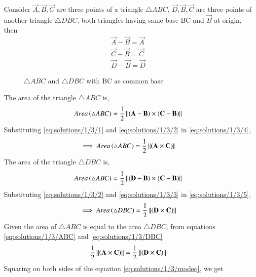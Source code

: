  Consider $\vec{A},\vec{B},\vec{C}$ are three points of a triangle $\triangle ABC$, $\vec{D}, \vec{B}, \vec{C}$ are three points of another triangle $\triangle DBC$, both triangles having same base BC and $\vec{B}$ at origin, then
\begin{align}
    \label{eq:solutions/1/3/1}
    \vec{A}-\vec{B}=\vec{A}\\
    \label{eq:solutions/1/3/2}
    \vec{C}-\vec{B}=\vec{C}\\
    \label{eq:solutions/1/3/3}
    \vec{D}-\vec{B}=\vec{D}
\end{align}
\begin{figure}[!ht]
\centering
\resizebox{\columnwidth}{!}{}
\caption{$\triangle ABC$ and $\triangle DBC$ with BC as common base}
\label{eq:solutions/1/3/fig:1.2}
\end{figure}
The area of the triangle $\triangle ABC$ is,
\begin{align}
    \label{eq:solutions/1/3/4}
    Area\left(\triangle ABC\right) = \frac{1}{2}\left\lVert\left(\mathbf{A} - \mathbf{B}\right) \times \left(\mathbf{C} - \mathbf{B}\right)\right\rVert
\end{align}
Substituting \eqref{eq:solutions/1/3/1} and \eqref{eq:solutions/1/3/2} in \eqref{eq:solutions/1/3/4}, 
\begin{align}
    \label{eq:solutions/1/3/ABC}
    \implies Area\left(\triangle ABC\right) = \frac{1}{2}\left\lVert\left(\mathbf{A} \times \mathbf{C}\right)\right\rVert
\end{align}
The area of the triangle $\triangle DBC$ is,
\begin{align}
    \label{eq:solutions/1/3/5}
    Area\left(\triangle ABC\right) = \frac{1}{2}\left\lVert\left(\mathbf{D} - \mathbf{B}\right) \times \left(\mathbf{C} - \mathbf{B}\right)\right\rVert
\end{align}   
Substituting \eqref{eq:solutions/1/3/2} and \eqref{eq:solutions/1/3/3} in \eqref{eq:solutions/1/3/5}, 
\begin{align}
    \label{eq:solutions/1/3/DBC}
    \implies Area\left(\triangle DBC\right) = \frac{1}{2}\left\lVert\left(\mathbf{D} \times \mathbf{C}\right)\right\rVert
\end{align}
Given the area of $\triangle ABC$ is equal to the area $\triangle DBC$, from equations \eqref{eq:solutions/1/3/ABC} and \eqref{eq:solutions/1/3/DBC}
\begin{align}
    \label{eq:solutions/1/3/modeq}
    \frac{1}{2}\left\lVert\left(\mathbf{A} \times \mathbf{C}\right)\right\rVert = \frac{1}{2}\left\lVert\left(\mathbf{D} \times \mathbf{C}\right)\right\rVert
\end{align}
Squaring on both sides of the equation \eqref{eq:solutions/1/3/modeq}, we get

